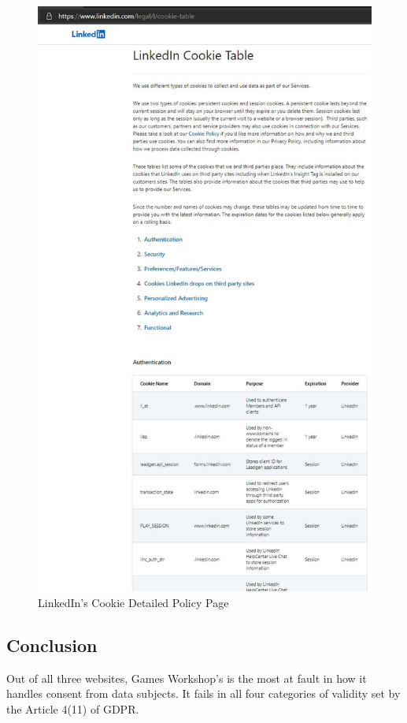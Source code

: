 \documentclass[twocolumn, letterpaper]{scrartcl}
\begin{document}
        \begin{figure}[tbp]	
        \includegraphics[width=0.9\linewidth]{ld_table.JPG}
        \caption{LinkedIn's Cookie Detailed Policy Page \label{fig:i}}
        \end{figure}
        
	\subsection*{Conclusion}
	
	Out of all three websites, Games Workshop's is the most at fault in how it handles consent from data subjects. It fails in all four categories of validity set by the Article 4(11) of GDPR.
	
\end{document}
